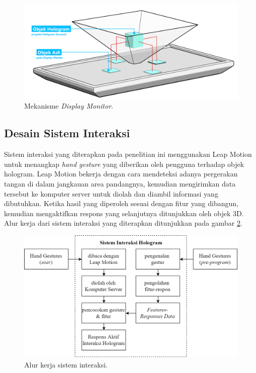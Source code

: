 		\vspace{-2ex}
		\begin{figure}[H]
			\includegraphics[width=\textwidth]{img/bab3/mekanismehologram.png}
			\caption{Mekanisme \textit{Display Monitor}.}
			\label{fig:proyeksihologram}
		\end{figure}
	\vspace{1.5ex}
	
	\subsection{Desain Sistem Interaksi}
	\vspace{1ex}
		Sistem interaksi yang diterapkan pada penelitian ini menggunakan Leap Motion untuk menangkap \textit{hand gesture} yang diberikan oleh pengguna terhadap objek hologram. Leap Motion bekerja dengan cara mendeteksi adanya pergerakan tangan di dalam jangkauan area pandangnya, kemudian mengirimkan data tersebut ke komputer server untuk diolah dan diambil informasi yang dibutuhkan. Ketika hasil yang diperoleh sesuai dengan fitur yang dibangun, kemudian mengaktifkan respons yang selanjutnya ditunjukkan oleh objek 3D. Alur kerja dari sistem interaksi yang diterapkan ditunjukkan pada gambar \ref{fig:desain_interaksi}.
		\begin{figure} [H]
			\includegraphics[width=\textwidth]{img/bab3/desain_interaksi.png}
			\caption{Alur kerja sistem interaksi.}
			\label{fig:desain_interaksi}
		\end{figure}
		\vspace{-2ex}
	
